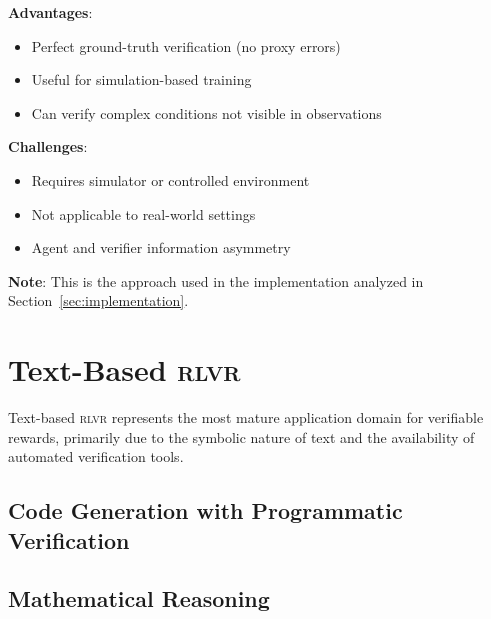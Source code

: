 \documentclass[11pt,a4paper]{article}
\newcommand{\rlvr}{\textsc{rlvr}}
\begin{document}
\textbf{Advantages}:
\begin{itemize}[leftmargin=*]
    \item Perfect ground-truth verification (no proxy errors)
    \item Useful for simulation-based training
    \item Can verify complex conditions not visible in observations
\end{itemize}

\textbf{Challenges}:
\begin{itemize}[leftmargin=*]
    \item Requires simulator or controlled environment
    \item Not applicable to real-world settings
    \item Agent and verifier information asymmetry
\end{itemize}

\textbf{Note}: This is the approach used in the implementation analyzed in Section~\ref{sec:implementation}.

\section{Text-Based \rlvr{}}
\label{sec:text}

Text-based \rlvr{} represents the most mature application domain for verifiable rewards, primarily due to the symbolic nature of text and the availability of automated verification tools.

\subsection{Code Generation with Programmatic Verification}
\label{sec:code_generation}


\subsection{Mathematical Reasoning}
\label{sec:math_reasoning}

\end{document}
